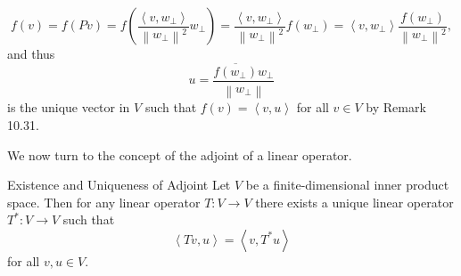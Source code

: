 \documentclass[linearalgebra]{subfiles}
\begin{document}
\begin{remark}
        \begin{equation*}
            f(v) = f\left( Pv \right) = f\left( \frac{\left\langle v, w_\perp\right\rangle }{\left\lVert w_\perp\right\rVert ^2}w_\perp \right) = \frac{\left\langle v, w_\perp\right\rangle }{\left\lVert w_\perp\right\rVert ^2}f\left( w_\perp \right) = \left\langle v, w_\perp\right\rangle \frac{f\left( w_\perp \right) }{\left\lVert w_\perp\right\rVert ^2},
        \end{equation*}
        and thus
        \begin{equation*}
            u = \frac{\overline{f\left( w_\perp \right) }w_\perp}{\left\lVert w_\perp\right\rVert }
        \end{equation*}
        is the unique vector in $V$ such that $f(v) = \left\langle v, u\right\rangle$ for all $v\in V$ by Remark 10.31.
    \end{remark}

    \begin{remark}
        We now turn to the concept of the adjoint of a linear operator.
    \end{remark}

    \begin{theorem}{Existence and Uniqueness of Adjoint}
        Let $V$ be a finite-dimensional inner product space. Then for any linear operator $T:V\to V$ there exists a unique linear operator $T^*:V\to V$ such that
        \begin{equation*}
            \left\langle Tv, u\right\rangle = \left\langle v, T^*u\right\rangle 
        \end{equation*}
        for all $v,u\in V$.
    \end{theorem}
\end{document}
